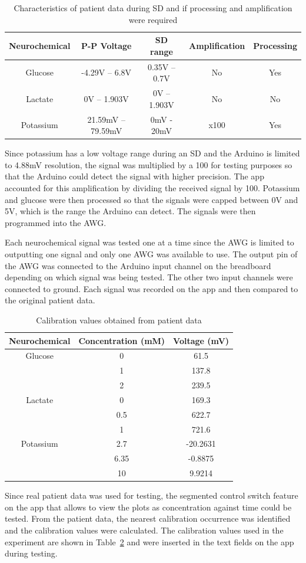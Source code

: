 \begin{table}[h!]
\centering
\begin{tabular}{||c c c c c||} 
 \hline
 Neurochemical & P-P Voltage & SD range & Amplification & Processing\\ [0.5ex] 
 \hline\hline
 Glucose & -4.29V -- 6.8V & 0.35V -- 0.7V & No & Yes \\
 Lactate & 0V -- 1.903V & 0V -- 1.903V & No & No \\
 Potassium & 21.59mV -- 79.59mV & 0mV - 20mV & x100 & Yes \\
 \hline
\end{tabular}
\caption{Characteristics of patient data during SD and if processing and amplification were required}
\label{table: patient data}
\end{table}

Since potassium has a low voltage range during an SD and the Arduino is limited to 4.88mV resolution, the signal was multiplied by a 100 for testing purposes so that the Arduino could detect the signal with higher precision. The app accounted for this amplification by dividing the received signal by 100. Potassium and glucose were then processed so that the signals were capped between 0V and 5V, which is the range the Arduino can detect. The signals were then programmed into the AWG. 

Each neurochemical signal was tested one at a time since the AWG is limited to outputting one signal and only one AWG was available to use. The output pin of the AWG was connected to the Arduino input channel on the breadboard depending on which signal was being tested. The other two input channels were connected to ground. Each signal was recorded on the app and then compared to the original patient data.

\begin{table}[h!]
\centering
\begin{tabular}{||c c c||} 
 \hline
 Neurochemical & Concentration (mM) & Voltage (mV) \\ [0.5ex]
 \hline\hline
 Glucose & 0 & 61.5 \\
  & 1 & 137.8 \\
  & 2 & 239.5 \\
 Lactate & 0 & 169.3 \\
  & 0.5 & 622.7 \\
  & 1 & 721.6 \\
 Potassium & 2.7 & -20.2631 \\
  & 6.35 & -0.8875 \\
  & 10 & 9.9214 \\
 \hline
\end{tabular}
\caption{Calibration values obtained from patient data}
\label{table: test2 calibration}
\end{table}

Since real patient data was used for testing, the segmented control switch feature on the app that allows to view the plots as concentration against time could be tested. From the patient data, the nearest calibration occurrence was identified and the calibration values were calculated. The calibration values used in the experiment are shown in Table~\ref{table: test2 calibration} and were inserted in the text fields on the app during testing.


